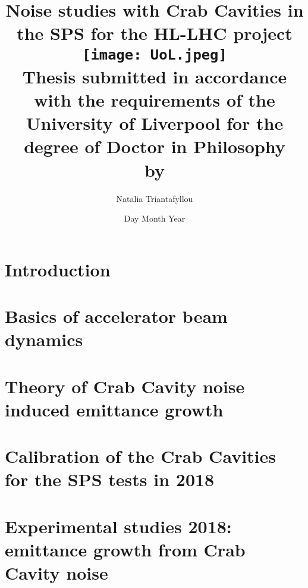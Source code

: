 \documentclass[12pt,twoside]{report} %
\begin{document}
\frontmatter
\title{
{Noise studies with Crab Cavities in the SPS for the HL-LHC project}\\
{\texttt{[image: UoL.jpeg]}} \\
{\large Thesis submitted in accordance with the requirements of the University of Liverpool for the degree of Doctor in Philosophy \\ by}
}
\author{ Natalia Triantafyllou}
\date{Day Month Year}
\maketitle
\newpage




\listoffigures
{}
\listoftables
{}

\newpage

\thispagestyle{plain} %

\listofsymbols
{}

\tableofcontents

\mainmatter

\chapter{Introduction}


\chapter{Basics of accelerator beam dynamics}


\chapter{Theory of Crab Cavity noise induced emittance growth}\label{Ch:CC_noise_theory}


\chapter{Calibration of the Crab Cavities for the SPS tests in 2018}\label{Ch:CC_set_up}


\chapter{Experimental studies 2018: emittance growth from Crab Cavity noise}\label{Ch:2018_setup}

\end{document}
